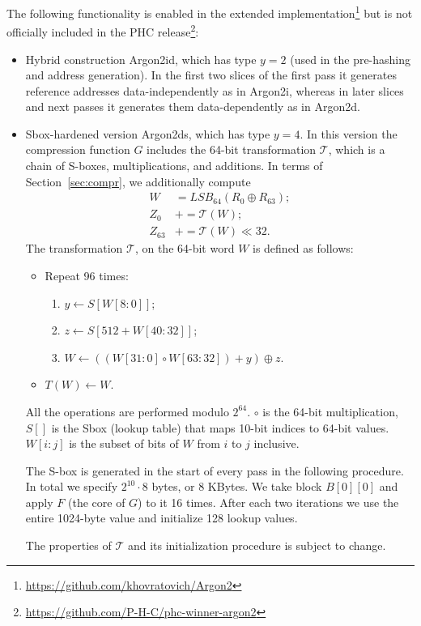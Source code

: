 \documentclass[a4paper]{article}
\begin{document}
The following functionality is enabled in the extended implementation\footnote{\url{https://github.com/khovratovich/Argon2}} but is 
not officially included in the PHC release\footnote{\url{https://github.com/P-H-C/phc-winner-argon2}}:
\begin{itemize}
\item Hybrid construction \textsf{Argon2id}, which has type $y=2$ (used in the pre-hashing and address generation). In the first two slices of the first pass it generates reference addresses data-independently as in \textsf{Argon2i}, whereas in later slices and next passes it generates them data-dependently as in \textsf{Argon2d}.
\item Sbox-hardened version \textsf{Argon2ds}, which has type $y=4$. In this version the compression function $G$ includes the 64-bit transformation $\mathcal{T}$, which is a chain of S-boxes, multiplications, and additions. In terms of Section~\ref{sec:compr}, we additionally compute 
\begin{align*}
W&= LSB_{64}(R_0\oplus R_{63});\\
Z_0 &+= \mathcal{T}(W);\\
Z_{63}&+=\mathcal{T}(W)\ll 32.
\end{align*}
The transformation $\mathcal{T}$, on the 64-bit word $W$  is defined as follows:
\begin{itemize}
\item Repeat 96 times:
\begin{enumerate}
\item $y\leftarrow S[W[8:0]]$;
\item $z\leftarrow S[512+W[40:32]]$;
\item $W \leftarrow ((W[31:0]\circ W[63:32])+y)\oplus z$.
\end{enumerate}
\item $T(W)\leftarrow W$.
\end{itemize}
All the operations are performed modulo $2^{64}$. $\circ$ is the 64-bit multiplication, $S[]$ is the Sbox (lookup table) that maps 10-bit indices to 64-bit values. $W[i:j]$ is the subset of bits of $W$ from $i$ to $j$ inclusive. 

The S-box is generated in the start of every  pass in the following procedure. In total we specify $2^{10}\cdot 8$ bytes, or 8 KBytes. We take block $B[0][0]$ and apply $F$ (the core of $G$) to it 16 times. After each two iterations we use the entire 1024-byte value and initialize 128 lookup values.

The properties of $\mathcal{T}$ and its initialization procedure is subject to change.
\end{itemize}
\end{document}
